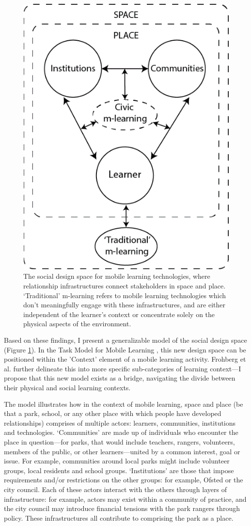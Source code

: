 \begin{figure}
  \centering
  \includegraphics[width=0.45\columnwidth]{images/chapter04/designSpace.png}
  \caption[The social design space for mobile learning technologies]{The social design space for mobile learning technologies, where relationship infrastructures connect stakeholders in space and place. `Traditional' m-learning refers to mobile learning technologies which don’t meaningfully engage with these infrastructures, and are either independent of the learner’s context or concentrate solely on the physical aspects of the environment.}
  \label{fig:designSpace}
\end{figure}

Based on these findings, I present a generalizable model of the social design space (Figure \ref{fig:designSpace}). In the Task Model for Mobile Learning \citep{Taylor2006}, this new design space can be positioned within the 'Context' element of a mobile learning activity. Frohberg et al. further delineate this into more specific sub-categories of learning context---I propose that this new model exists as a bridge, navigating the divide between their physical and social learning contexts.

The model illustrates how in the context of mobile learning, space and place (be that a park, school, or any other place with which people have developed relationships) comprises of multiple actors: learners, communities, institutions and technologies. `Communities' are made up of individuals who encounter the place in question---for parks, that would include teachers, rangers, volunteers, members of the public, or other learners---united by a common interest, goal or issue. For example, communities around local parks might include volunteer groups, local residents and school groups. `Institutions' are those that impose requirements and/or restrictions on the other groups: for example, Ofsted or the city council. Each of these actors interact with the others through layers of infrastructure: for example, actors may exist within a community of practice, and the city council may introduce financial tensions with the park rangers through policy. These infrastructures all contribute to comprising the park as a place.

